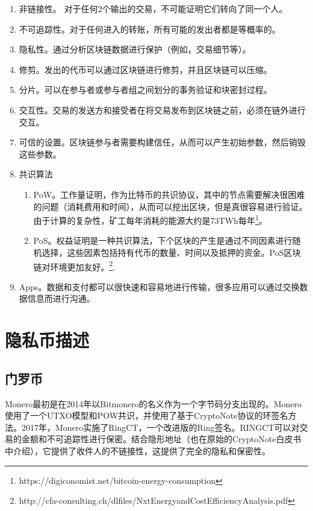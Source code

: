 \documentclass[8pt,fleqn,openany]{book}
\begin{document}
\begin{CJK*}{UTF8}{gbsn}
{\begin{enumerate}
	\item 非链接性。 对于任何2个输出的交易，不可能证明它们转向了同一个人\cite{c2}。
	\item 不可追踪性。对于任何进入的转账，所有可能的发出者都是等概率的\cite{c2}。
	\item 隐私性。通过分析区块链数据进行保护（例如，交易细节等）。  	
	\item 修剪。发出的代币可以通过区块链进行修剪，并且区块链可以压缩。
	\item 分片。可以在参与者或参与者组之间划分的事务验证和块密封过程。
	\item 交互性。交易的发送方和接受者在将交易发布到区块链之前，必须在链外进行交互。
	\item 可信的设置。区块链参与者需要构建信任，从而可以产生初始参数，然后销毁这些参数。
	\item 共识算法
	\begin{enumerate}
		\item PoW。工作量证明，作为比特币的共识协议，其中的节点需要解决很困难的问题（消耗费用和时间），从而可以挖出区块，但是真很容易进行验证。由于计算的复杂性，矿工每年消耗的能源大约是73TWh每年\footnote{https://digiconomist.net/bitcoin-energy-consumption}。
		\item PoS。权益证明是一种共识算法，下个区块的产生是通过不同因素进行随机选择，这些因素包括持有代币的数量、时间以及抵押的资金。PoS区块链对环境更加友好。\footnote{http://cfa-consulting.ch/dlfiles/NxtEnergyandCostEfficiencyAnalysis.pdf}.
	\end{enumerate}
	\item Apps。数据和支付都可以很快速和容易地进行传输，很多应用可以通过交换数据信息而进行沟通。
\end{enumerate}

\section{隐私币描述}

\subsection{门罗币} Monero最初是在2014年以Bitmonero的名义作为一个字节码分支出现的。Monero使用了一个UTXO模型和POW共识，并使用了基于CryptoNote协议\cite{c2}的环签名方法。2017年，Monero实施了RingCT\cite{c3}，一个改进版的Ring签名。RINGCT可以对交易的金额和不可追踪性进行保密。结合隐形地址（也在原始的CryptoNote白皮书中介绍），它提供了收件人的不链接性，这提供了完全的隐私和保密性。

}
\end{CJK*}
\end{document}
